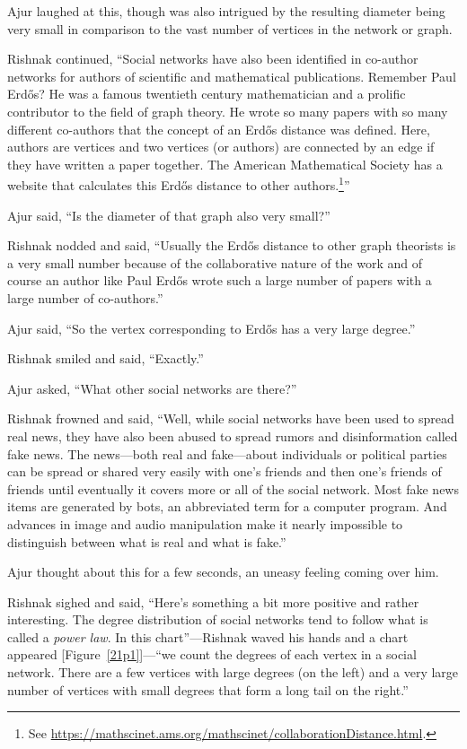 Ajur laughed at this, though was also intrigued by the resulting diameter being very small in comparison to the vast number of vertices in the network or graph.

Rishnak continued, ``Social networks have also been identified in co-author networks for authors of scientific and mathematical publications. Remember Paul Erd\H{o}s? He was a famous twentieth century mathematician and a prolific contributor to the field of graph theory. He wrote so many papers with so many different co-authors that the concept of an Erd\H{o}s distance was defined. Here, authors are vertices and two vertices (or authors) are connected by an edge if they have written a paper together. The American Mathematical Society has a website that calculates this Erd\H{o}s distance to other authors.\footnote{See \url{https://mathscinet.ams.org/mathscinet/collaborationDistance.html}.}''

Ajur said, ``Is the diameter of that graph also very small?''

Rishnak nodded and said, ``Usually the Erd\H{o}s distance to other graph theorists is a very small number because of the collaborative nature of the work and of course an author like Paul Erd\H{o}s wrote such a large number of papers with a large number of co-authors.''

Ajur said, ``So the vertex corresponding to Erd\H{o}s has a very large degree.''

Rishnak smiled and said, ``Exactly.''

Ajur asked, ``What other social networks are there?''

Rishnak frowned and said, ``Well, while social networks have been used to spread real news, they have also been abused to spread rumors and disinformation called fake news. The news---both real and fake---about individuals or political parties can be spread or shared very easily with one's friends and then one's friends of friends until eventually it covers more or all of the social network. Most fake news items are generated by bots, an abbreviated term for a computer program. And advances in image and audio manipulation make it nearly impossible to distinguish between what is real and what is fake.''

Ajur thought about this for a few seconds, an uneasy feeling coming over him.

Rishnak sighed and said, ``Here's something a bit more positive and rather interesting. The degree distribution of social networks tend to follow what is called a \textit{power law}. In this chart''---Rishnak waved his hands and a chart appeared [Figure~\ref{21p1}]---``we count the degrees of each vertex in a social network. There are a few vertices with large degrees (on the left) and a very large number of vertices with small degrees that form a long tail on the right.''

